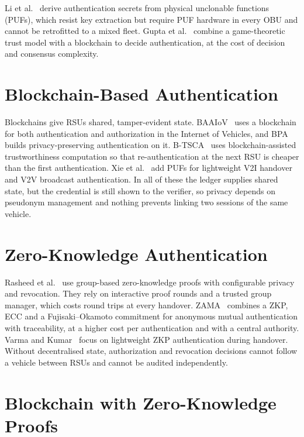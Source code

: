Li et al.~\cite{li2024puf} derive authentication secrets from physical unclonable functions (PUFs),
which resist key extraction but require PUF hardware in every OBU and cannot be retrofitted to a mixed
fleet. Gupta et al.~\cite{gupta2022game} combine a game-theoretic trust model with a blockchain to
decide authentication, at the cost of decision and consensus complexity.

\section{Blockchain-Based Authentication}

Blockchains give RSUs shared, tamper-evident state. BAAIoV~\cite{alsaeed2025baaiov} uses a blockchain
for both authentication and authorization in the Internet of Vehicles, and BPA~\cite{li2024bpa} builds
privacy-preserving authentication on it. B-TSCA~\cite{wang2021btsca} uses blockchain-assisted
trustworthiness computation so that re-authentication at the next RSU is cheaper than the first
authentication. Xie et al.~\cite{xie2023handover} add PUFs for lightweight V2I handover and V2V
broadcast authentication. In all of these the ledger supplies shared state, but the credential is
still shown to the verifier, so privacy depends on pseudonym management and nothing prevents linking
two sessions of the same vehicle.

\section{Zero-Knowledge Authentication}

Rasheed et al.~\cite{rasheed2020adaptive} use group-based zero-knowledge proofs with configurable
privacy and revocation. They rely on interactive proof rounds and a trusted group manager, which costs
round trips at every handover. ZAMA~\cite{xi2022zama} combines a ZKP, ECC and a Fujisaki--Okamoto
commitment for anonymous mutual authentication with traceability, at a higher cost per
authentication and with a central authority. Varma and Kumar~\cite{varma2023zkp} focus on lightweight
ZKP authentication during handover. Without decentralised state, authorization and revocation
decisions cannot follow a vehicle between RSUs and cannot be audited independently.

\section{Blockchain with Zero-Knowledge Proofs}

